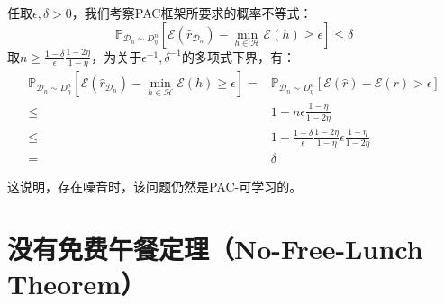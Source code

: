 \documentclass[12pt, a4paper]{article}
\newcommand{\under}[1]{\mathop{#1}\limits_}
\newcommand{\prob}{{\mathbb{P}}}
\newcommand{\EE}{{\mathcal{E}}}
\newcommand{\HH}{{\mathcal{H}}}
\newcommand{\DD}{{\mathcal{D}}}
\newcommand{\rh}{{\widehat{r}}}
\begin{document}
\begin{enumerate}
        任取$\epsilon, \delta > 0$，我们考察PAC框架所要求的概率不等式：
        \begin{equation}
        \prob_{\DD_n \sim D_\eta^n}[\EE(\rh_{\DD_n}) - \under{\min}{h \in \HH} \EE(h) \ge \epsilon] \le \delta
        \end{equation}
        取$n \ge \frac{1 - \delta}{\epsilon} \frac{1 - 2 \eta}{1 - \eta}$，为关于$\epsilon^{-1}, \delta^{-1}$的多项式下界，有：
        \begin{align*}
        \prob_{\DD_n \sim D_\eta^n}[\EE(\rh_{\DD_n}) - \under{\min}{h \in \HH} \EE(h) \ge \epsilon]
        =& \prob_{\DD_n \sim D_\eta^n} [\EE(\rh) - \EE(r) > \epsilon] \\
        \le& 1 - n \epsilon \frac{1 - \eta}{1 - 2 \eta} \\
        \le& 1 - \frac{1 - \delta}{\epsilon} \frac{1 - 2 \eta}{1 - \eta} \epsilon \frac{1 - \eta}{1 - 2 \eta} \\
        =& \delta
        \end{align*}

        这说明，存在噪音时，该问题仍然是PAC-可学习的。

    \end{enumerate}

    \section{没有免费午餐定理（No-Free-Lunch Theorem）}
\end{document}

